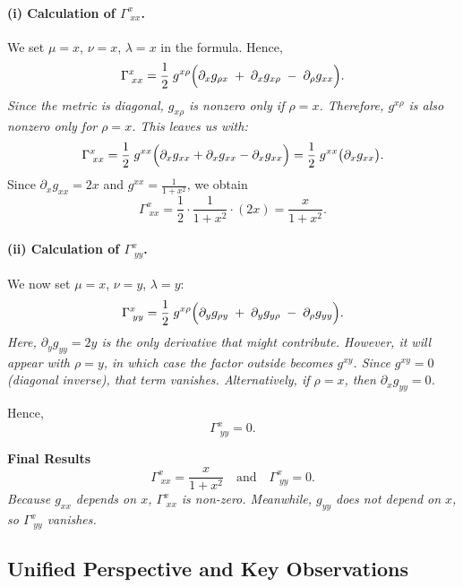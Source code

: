 \bigskip

\paragraph{(i) Calculation of \(\Gamma^x_{\;xx}\).}

\noindent
We set \(\mu = x\), \(\nu = x\), \(\lambda = x\) in the formula. Hence,
\[
\Gamma^x_{\;xx}
=
\frac{1}{2}\;g^{x\rho}
\Bigl(
\partial_x g_{\rho x}
\;+\;
\partial_x g_{x \rho}
\;-\;
\partial_\rho g_{xx}
\Bigr).
\]
\emph{Since the metric is diagonal, \(g_{x\rho}\) is nonzero only if \(\rho = x\). Therefore, \(g^{x\rho}\) is also nonzero only for \(\rho = x\). This leaves us with:}
\[
\Gamma^x_{\;xx}
=
\frac12 \; g^{xx}
\Bigl(
\partial_x g_{xx}
+ \partial_x g_{xx}
- \partial_x g_{xx}
\Bigr)
=
\frac12 \; g^{xx}
\bigl(\partial_x g_{xx}\bigr).
\]
Since \(\partial_x g_{xx} = 2x\) and \(g^{xx} = \tfrac{1}{1 + x^2}\), we obtain
\[
\Gamma^x_{\;xx}
=
\frac12 \cdot \frac{1}{1 + x^2} \cdot (2x)
=
\frac{x}{1 + x^2}.
\]

\bigskip

\paragraph{(ii) Calculation of \(\Gamma^x_{\;yy}\).}

\noindent
We now set \(\mu = x\), \(\nu = y\), \(\lambda = y\):
\[
\Gamma^x_{\;yy}
=
\frac{1}{2}\;g^{x\rho}
\Bigl(
\partial_y g_{\rho y}
\;+\;
\partial_y g_{y \rho}
\;-\;
\partial_\rho g_{yy}
\Bigr).
\]
\emph{Here, \(\partial_y g_{yy} = 2y\) is the only derivative that might contribute. However, it will appear with \(\rho = y\), in which case the factor outside becomes \(g^{xy}\). Since \(g^{xy} = 0\) (diagonal inverse), that term vanishes. Alternatively, if \(\rho = x\), then \(\partial_x g_{yy} = 0\).}

Hence,
\[
\Gamma^x_{\;yy} = 0.
\]

\bigskip

\noindent
\textbf{Final Results}
\[
\boxed{
\Gamma^x_{\;xx} = \frac{x}{1 + x^2}
\quad\text{and}\quad
\Gamma^x_{\;yy} = 0.
}
\]
\emph{Because \(g_{xx}\) depends on \(x\), \(\Gamma^x_{\;xx}\) is non-zero. Meanwhile, \(g_{yy}\) does not depend on \(x\), so \(\Gamma^x_{\;yy}\) vanishes.}

\bigskip

\subsection*{Unified Perspective and Key Observations}


